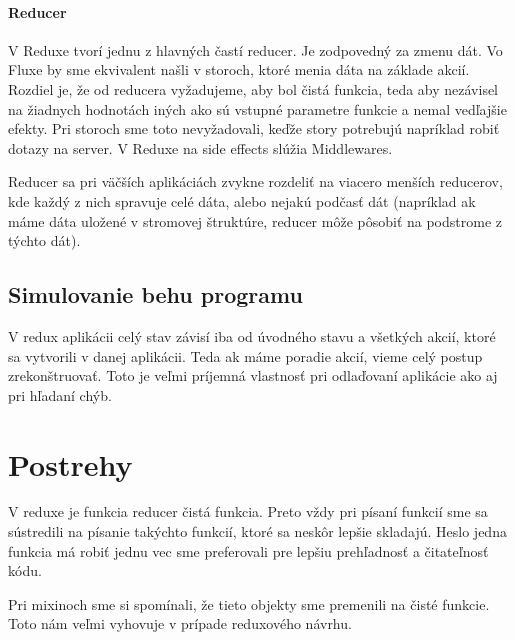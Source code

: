 \paragraph{Reducer}%
V Reduxe tvorí jednu z hlavných častí reducer. Je zodpovedný za zmenu dát. Vo Fluxe by sme ekvivalent našli v storoch, ktoré menia dáta na základe akcií. Rozdiel je, že od reducera vyžadujeme, aby bol čistá funkcia, teda aby nezávisel na žiadnych hodnotách iných ako sú vstupné parametre funkcie a nemal vedľajšie efekty. Pri storoch sme toto nevyžadovali, keďže story potrebujú napríklad robiť dotazy na server. V Reduxe na side effects slúžia Middlewares.

Reducer sa pri väčších aplikáciách zvykne rozdeliť na viacero menších reducerov, kde každý z nich spravuje celé dáta, alebo nejakú podčasť dát (napríklad ak máme dáta uložené v stromovej štruktúre, reducer môže pôsobiť na podstrome z týchto dát).

\subsection{Simulovanie behu programu}
V redux aplikácii celý stav závisí iba od úvodného stavu a všetkých akcií, ktoré sa vytvorili v danej aplikácii. Teda ak máme poradie akcií, vieme celý postup zrekonštruovať. Toto je veľmi príjemná vlastnosť pri odlaďovaní aplikácie ako aj pri hľadaní chýb.

\section{Postrehy} \TODO{}
V reduxe je funkcia reducer čistá funkcia. Preto vždy pri písaní funkcií sme sa sústredili na písanie takýchto funkcií, ktoré sa neskôr lepšie skladajú. Heslo jedna funkcia má robiť jednu vec sme preferovali pre lepšiu prehľadnosť a čitateľnosť kódu.

Pri mixinoch sme si spomínali, že tieto objekty sme premenili na čisté funkcie. Toto nám veľmi vyhovuje v prípade reduxového návrhu.

